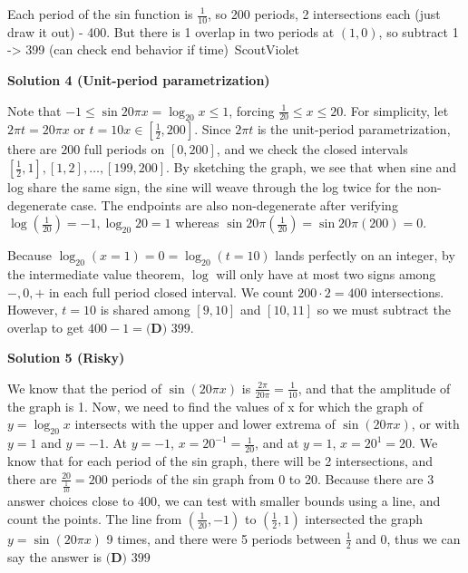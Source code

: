 \begin{enumerate}
Each period of the sin function is $\frac{1}{10}$, so 200 periods, 2 intersections each (just draw it out) - 400. But there is 1 overlap in two periods at $(1,0)$, so subtract 1 -> 399 (can check end behavior if time)~ScoutViolet

 



\textbf{Solution 4 (Unit-period parametrization)}

Note that $-1\le \sin 20\pi x=\log_{20} x\le 1$, forcing $\frac{1}{20}\le x\le 20$. For simplicity, let $2\pi t=20\pi x$ or $t=10x\in\left[ \frac{1}{2},200 \right]$. Since $2\pi t$ is the unit-period parametrization, there are $200$ full periods on $[0,200]$, and we check the closed intervals $\left[ \frac{1}{2},1 \right],[1,2],\dots,[199,200]$. By sketching the graph, we see that when sine and log share the same sign, the sine will weave through the log twice for the non-degenerate case. The endpoints are also non-degenerate after verifying $\log\left( \frac{1}{20} \right)=-1,\log_{20}20=1$ whereas $\sin 20\pi \left( \frac{1}{20} \right)=\sin 20\pi(200)=0$.

 Because $\log_{20}(x=1)=0=\log_{20}(t=10)$ lands perfectly on an integer, by the intermediate value theorem, $\log$ will only have at most two signs among $-,0,+$ in each full period closed interval. We count $200\cdot 2=400$ intersections. However, $t=10$ is shared among $[9,10]$ and $[10,11]$ so we must subtract the overlap to get $400-1=\boxed{\textbf{(D) } 399}$.

 



\textbf{Solution 5 (Risky)}

We know that the period of $\sin(20\pi x)$ is $\frac{2\pi}{20\pi}=\frac{1}{10}$, and that the amplitude of the graph is 1. Now, we  need to find the values of x for which the graph of $y=\log_{20} x$ intersects with the upper and lower extrema of $\sin(20\pi x)$, or with $y=1$ and $y=-1$. At $y=-1$, $x=20^{-1}=\frac{1}{20}$, and at $y=1$, $x=20^1=20$. We know that for each period of the sin graph, there will be 2 intersections, and there are $\frac{20}{\frac{1}{10}}=200$ periods of the sin graph from 0 to 20. Because there are 3 answer choices close to 400, we can test with smaller bounds using a line, and count the points. The line from $(\frac{1}{20},-1)$ to $(\frac{1}{2},1)$ intersected the graph $y=\sin(20\pi x)$ 9 times, and there were 5 periods between $\frac{1}{2}$ and $0$, thus we can say the answer is $\boxed{\textbf{(D) } 399}$


\end{enumerate}
